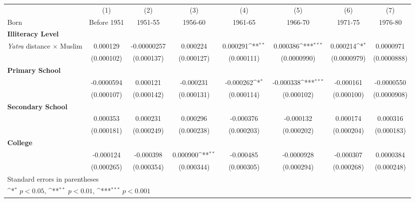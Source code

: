 {
\def\sym#1{\ifmmode^{#1}\else\(^{#1}\)\fi}
\begin{tabular}{l*{7}{c}}
\hline\hline
            &\multicolumn{1}{c}{(1)}&\multicolumn{1}{c}{(2)}&\multicolumn{1}{c}{(3)}&\multicolumn{1}{c}{(4)}&\multicolumn{1}{c}{(5)}&\multicolumn{1}{c}{(6)}&\multicolumn{1}{c}{(7)}\\
 Born           &\multicolumn{1}{c}{Before 1951}&\multicolumn{1}{c}{1951-55}&\multicolumn{1}{c}{1956-60}&\multicolumn{1}{c}{1961-65}&\multicolumn{1}{c}{1966-70}&\multicolumn{1}{c}{1971-75}&\multicolumn{1}{c}{1976-80}\\
 [1em]
\hline
\textbf{Illiteracy Level} & & \\
[1em]
\textit{Yatra} distance $\times$ Muslim &    0.000129 &    -0.00000257 & 0.000224 & 0.000291\sym{**} & 0.000386\sym{***} & 0.000214\sym{*} &   0.0000971\\
            &  (0.000102)         & (0.000137)    & (0.000127) & (0.000111) & (0.0000990) & (0.0000979) & (0.0000888)  \\
[1em]
\hline
\textbf{Primary School} & & \\
[1em]
&  -0.0000594 &  0.000121 &   -0.000231 & -0.000262\sym{*} &   -0.000338\sym{***} & -0.000161 &  -0.0000550\\
& (0.000107)         & (0.000142) &  (0.000131)   &  (0.000114)   &  (0.000102) &  (0.000100) & (0.0000908)\\
[1em]
\hline
\textbf{Secondary School} & & \\
[1em]
&    0.000353 &    0.000231    &    0.000296    & -0.000376 & -0.000132 &    0.000174 &    0.000316\\
&  (0.000181)         &  (0.000249)  &  (0.000238)  &  (0.000203) &  (0.000202)  &  (0.000204) &  (0.000183) \\
[1em]
\hline
\textbf{College} & & \\
[1em]
&    -0.000124 &    -0.000398 & 0.000900\sym{**} & -0.000485 &  -0.0000928 & -0.000307 & 0.0000384\\
&  (0.000265) &  (0.000354) & (0.000344) &  (0.000305) &  (0.000294) &  (0.000268) & (0.000248)\\
[1em]
\hline\hline
\multicolumn{3}{l}{\footnotesize Standard errors in parentheses}\\
\multicolumn{3}{l}{\footnotesize \sym{*} \(p<0.05\), \sym{**} \(p<0.01\), \sym{***} \(p<0.001\)}\\
\end{tabular}
}